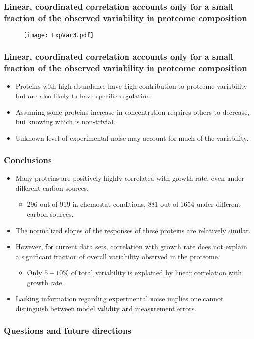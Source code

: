 \documentclass{beamer}
\begin{document}
\begin{frame}
\frametitle{Linear, coordinated correlation accounts only for a small fraction of the observed variability in proteome composition}
\begin{figure}[h!]
\centering
\texttt{[image: ExpVar3.pdf]}
\end{figure}
\end{frame}

\begin{frame}
\frametitle{Linear, coordinated correlation accounts only for a small fraction of the observed variability in proteome composition}
\begin{itemize}[<+->]
\item Proteins with high abundance have high contribution to proteome variability but are also likely to have specific regulation.
\item Assuming some proteins increase in concentration requires others to decrease, but knowing which is non-trivial.
\item Unknown level of experimental noise may account for much of the variability.
\end{itemize}
\end{frame}

\begin{frame}
\frametitle{Conclusions}
\begin{itemize}
\item Many proteins are positively highly correlated with growth rate, even under different carbon sources.
\begin{itemize}
\item 296 out of 919 in chemostat conditions, 881 out of 1654 under different carbon sources.
\end{itemize}
\item The normalized slopes of the responses of these proteins are relatively similar.
\item However, for current data sets, correlation with growth rate does not explain a significant fraction of overall variability observed in the proteome.
\begin{itemize}
\item Only $5-10\%$ of total variability is explained by linear correlation with growth rate.
\end{itemize}
\item Lacking information regarding experimental noise implies one cannot distinguish between model validity and measurement errors.
\end{itemize}
\end{frame}
\begin{frame}
\frametitle{Questions and future directions}
\end{frame}
\end{document}
